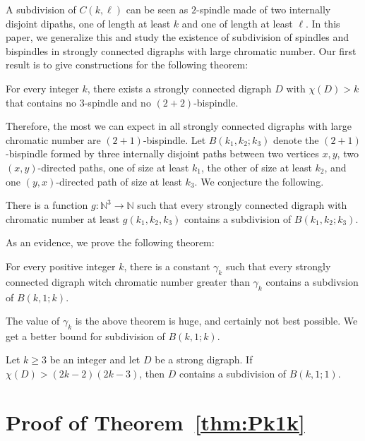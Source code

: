\documentclass{endm}
\begin{document}
A subdivision of $C(k,\ell)$ can be seen as $2$-spindle made of  two internally disjoint dipaths, one of length at least $k$ and one of length at least $\ell$.
In this paper, we generalize this and study the existence of subdivision of spindles and bispindles in strongly connected digraphs with large chromatic number.
Our first result is to give constructions for the following theorem: 
\begin{theorem}
For every integer $k$, there exists a strongly connected digraph $D$ with $\chi(D) >k$ that contains no $3$-spindle and no $(2+2)$-bispindle. 
\end{theorem}
Therefore, the most we can expect in all strongly connected digraphs with large chromatic number are $(2+1)$-bispindle. Let $B(k_1,k_2;k_3)$ denote the $(2+1)$-bispindle formed by three internally disjoint paths between two vertices $x,y$,
two $(x,y)$-directed paths, one of size at least $k_1$, the other of size at least $k_2$, and one $(y,x)$-directed path of size at least $k_3$.
We conjecture the following.

\begin{conjecture}\label{conj:3chemins}
There is a function $g:\mathbb{N}^3 \rightarrow \mathbb{N}$ such that  every strongly connected digraph with chromatic number at least $g(k_1,k_2,k_3)$ contains
a subdivision of $B(k_1,k_2;k_3)$.
\end{conjecture}

As an evidence, we prove the following theorem:

\begin{theorem}\label{thm:Pk1k}
For every positive integer $k$, there is a constant $\gamma_k$ such that every strongly connected digraph witch chromatic number greater than $\gamma_k$ contains
a subdivsion of $B(k,1;k)$.
\end{theorem}

The value of $\gamma_k$ is the above theorem is huge, and certainly not best possible. We get a better bound for subdivision of $B(k,1;k)$.
\begin{theorem}\label{th:P11k}
Let $k \geq 3$ be an integer and let $D$ be a strong digraph. If $\chi(D) >  (2k-2)(2k-3)$, then $D$ contains a subdivision of $B(k,1;1)$.
\end{theorem}


\section{Proof of Theorem~\ref{thm:Pk1k}}
\end{document}
